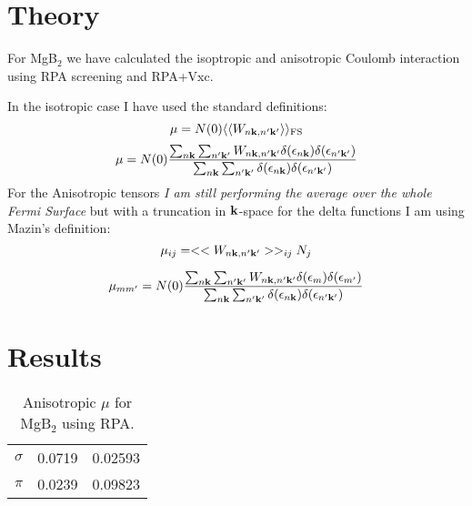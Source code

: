 \documentclass{article}
\def\ket{\rangle}
\def\bra{\langle}
\def\k{{\bf k}}
\begin{document}
\section{Theory}
  For MgB$_{2}$ we have calculated the isoptropic and anisotropic Coulomb interaction using RPA screening
and RPA+Vxc.


In the isotropic case I have used the standard definitions:
%
\begin{equation}
\mu = N(0)\bra\bra W_{n\k,n'\k'} \ket\ket_{\rm FS}
\end{equation}
%
\begin{equation}
\mu = N(0) \frac{\sum_{n\k}\sum_{n'\k'}W_{n\k,n'\k'}\delta(\epsilon_{n\k}) \delta(\epsilon_{n'\k'})}{\sum_{n\k}\sum_{n'\k'}\delta(\epsilon_{n\k})\delta(\epsilon_{n'\k'})}
\end{equation}
%
For the Anisotropic tensors \emph{I am still performing the average over the whole Fermi Surface} but with a truncation in $\k$-space for the delta functions I am using 
Mazin's definition:
%
\begin{equation}
\mu_{ij} = <<W_{n\k,n'\k'}>>_{ij} N_{j}
\end{equation}


\begin{equation}
\mu_{mm'} = N(0) \frac{\sum_{n\k}\sum_{n'\k'}W_{n\k,n'\k'}\delta(\epsilon_{m}) \delta(\epsilon_{m'})}{\sum_{n\k}\sum_{n'\k'}\delta(\epsilon_{n\k})\delta(\epsilon_{n'\k'})}
\end{equation}

\section{Results}
\begin{table}
\begin{center}
\begin{tabular}{l c c}
$\sigma$  & 0.0719  & 0.02593   \\
$\pi$     & 0.0239  & 0.09823   \\
\end{tabular}
\caption{Anisotropic $\mu$ for MgB$_2$ using RPA. \label{tab:mgb2aniso}}
\end{center}
\end{table}
\end{document}

